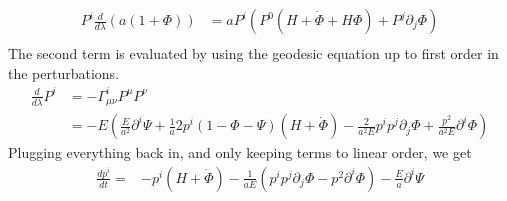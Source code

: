 \begin{equation}
	\begin{split}
		P^i\frac{d}{d\lambda}(a(1+\Phi)) %
		&= a P^i (P^0(H+\dot\Phi +H\Phi) + P^j\partial_j\Phi) \\
	\end{split}
\end{equation}
The second term is evaluated by using the geodesic equation up to first order in the perturbations.
\begin{equation}
	\begin{split}
		\frac{d}{d\lambda}P^i &= -\Gamma^i_{\mu\nu}P^\mu P^\nu \\
		&= -E\left( \frac{E}{a^2} \partial^i\Psi + \frac{1}{a}2p^i(1-\Phi-\Psi)(H+\dot\Phi) - \frac{2}{a^2E}p^ip^j\partial_j\Phi + \frac{p^2}{a^2E} \partial^i\Phi \right)
	\end{split}
\end{equation}
Plugging everything back in, and only keeping terms to linear order, we get
\begin{equation}
	\begin{split}
		\frac{dp^i}{dt} %
		=& -p^i(H+\dot\Phi)- \frac{1}{aE}\left(p^ip^j\partial_j\Phi - p^2\partial^i\Phi\right) -\frac{E}{a}\partial^i\Psi
	\end{split}
\end{equation}
